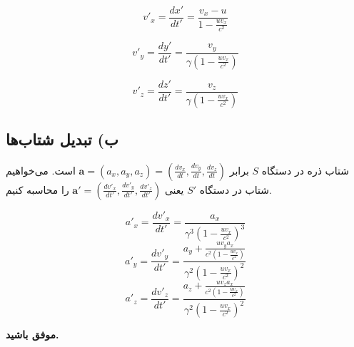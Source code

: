 \documentclass[a4paper,18pt]{article}
\begin{document}
	\[
	v'_x = \frac{dx'}{dt'} = \frac{v_x - u}{1 - \frac{u v_x}{c^2}}
	\]
	
	
	
	\[
	v'_y = \frac{dy'}{dt'} = \frac{v_y}{\gamma \left(1 - \frac{u v_x}{c^2}\right)}
	\]
	
	\[
	v'_z = \frac{dz'}{dt'} = \frac{v_z}{\gamma \left(1 - \frac{u v_x}{c^2}\right)}
	\]
	\subsection*{ب) تبدیل شتاب‌ها}
	
	شتاب ذره در دستگاه \( S \) برابر \( \mathbf{a} = (a_x, a_y, a_z) = \left( \frac{dv_x}{dt}, \frac{dv_y}{dt}, \frac{dv_z}{dt} \right) \) است. می‌خواهیم شتاب در دستگاه \( S' \) یعنی \( \mathbf{a}' = \left( \frac{dv'_x}{dt'}, \frac{dv'_y}{dt'}, \frac{dv'_z}{dt'} \right) \) را محاسبه کنیم.
	
\[
a'_x =\frac{dv'_x}{dt'} = \frac{a_x}{\gamma^3 \left( 1 - \frac{u v_x}{c^2} \right)^3 }
\]
\[
a'_y =\frac{dv'_y}{dt'} = \frac{ a_y + \frac{u v_y a_x}{c^2 \left(1 - \frac{u v_x}{c^2}\right)} }{ \gamma^2 \left( 1 - \frac{u v_x}{c^2} \right)^2 }
\]
\[
a'_z =\frac{dv'_z}{dt'}= \frac{ a_z + \frac{u v_z a_x}{c^2 \left(1 - \frac{u v_x}{c^2}\right)} }{ \gamma^2 \left( 1 - \frac{u v_x}{c^2} \right)^2 }
\]
	
	\vspace{10pt}
	\textbf{موفق باشید.}
\end{document}
